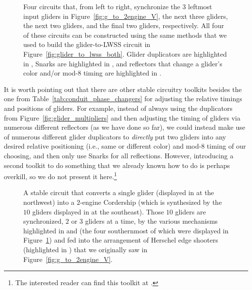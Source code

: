 \begin{figure}[!htb]
	\centering
	 \hfill {} \hfill {} \hfill {}
	\caption{Four circuits that, from left to right, synchronize the $3$ leftmost input gliders in Figure~\ref{fig:g_to_2engine_V}, the next three gliders, the next two gliders, and the final two gliders, respectively. All four of these circuits can be constructed using the same methods that we used to build the glider-to-LWSS circuit in Figure~\ref{fig:glider_to_lwss_both}. Glider duplicators are highlighted in , Snarks are highlighted in , and reflectors that change a glider's color and/or mod-$8$ timing are highlighted in .}\label{fig:2engine_synchronize}
\end{figure}

It is worth pointing out that there are other stable circuitry toolkits besides the one from Table~\ref{tab:conduit_phase_changers} for adjusting the relative timings and positions of gliders. For example, instead of always using the duplicators from Figure~\ref{fig:glider_multipliers} and then adjusting the timing of gliders via numerous different reflectors (as we have done so far), we could instead make use of numerous different glider duplicators to \emph{directly} put two gliders into any desired relative positioning (i.e., same or different color) and mod-$8$ timing of our choosing, and then only use Snarks for all reflections. However, introducing a second toolkit to do something that we already known how to do is perhaps overkill, so we do not present it here.\footnote{The interested reader can find this toolkit at .}

\begin{figure}[!htb]
	\centering
	\caption{A stable circuit that converts a single glider (displayed in  at the northwest) into a $2$-engine Cordership (which is synthesized by the $10$ gliders displayed in  at the southeast). Those $10$ gliders are synchronized, $2$ or $3$ gliders at a time, by the various mechanisms highlighted in  and  (the four southernmost of which were displayed in Figure~\ref{fig:2engine_synchronize}) and fed into the arrangement of Herschel edge shooters (highlighted in ) that we originally saw in Figure~\ref{fig:g_to_2engine_V}.}\label{fig:glider_to_2engine_cordership}
\end{figure}


